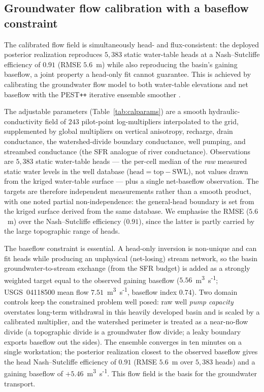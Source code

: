 \subsection{Groundwater flow calibration with a baseflow constraint}
\label{sec:calibration}

The calibrated flow field is simultaneously head- and flux-consistent: the deployed posterior
realization reproduces $5{,}383$ static water-table heads at a Nash--Sutcliffe efficiency of $0.91$
(RMSE $5.6$~m) while also reproducing the basin's gaining baseflow, a joint property a head-only fit
cannot guarantee. This is achieved by calibrating the groundwater flow model to both water-table
elevations and net baseflow with the PEST\texttt{++} iterative ensemble smoother
\citep{white2020pestpp}.

The adjustable parameters (Table~\ref{tab:calparams}) are a smooth hydraulic-conductivity field of
$243$ pilot-point log-multipliers interpolated to the grid, supplemented by global multipliers on
vertical anisotropy, recharge, drain conductance, the watershed-divide boundary conductance, well
pumping, and streambed conductance (the SFR analogue of river conductance). Observations are
$5{,}383$ static water-table heads --- the per-cell median of the \emph{raw} measured static water
levels in the well database ($\text{head} = \text{top} - \text{SWL}$), not values drawn from the
kriged water-table surface --- plus a single net-baseflow observation. The targets are therefore
independent measurements rather than a smooth product, with one noted partial non-independence: the
general-head boundary is set from the kriged surface derived from the same database. We emphasise the
RMSE ($5.6$~m) over the Nash--Sutcliffe efficiency ($0.91$), since the latter is partly carried by
the large topographic range of heads.

The baseflow constraint is essential. A head-only inversion is non-unique and can fit heads while
producing an unphysical (net-losing) stream network, so the basin groundwater-to-stream exchange
(from the SFR budget) is added as a strongly weighted target equal to the observed gaining baseflow
($5.56$~m\textsuperscript{3}~s\textsuperscript{-1}; USGS~04118500 mean flow
$7.51$~m\textsuperscript{3}~s\textsuperscript{-1}, baseflow index $0.74$). Two domain controls keep
the constrained problem well posed: raw well \emph{pump capacity} overstates long-term withdrawal in
this heavily developed basin and is scaled by a calibrated multiplier, and the watershed perimeter is
treated as a near-no-flow divide (a topographic divide is a groundwater flow divide; a leaky boundary
exports baseflow out the sides). The ensemble converges in ten minutes on a single workstation; the
posterior realization closest to the observed baseflow gives the head Nash--Sutcliffe efficiency of
$0.91$ (RMSE $5.6$~m over $5{,}383$ heads) and a gaining baseflow of
$+5.46$~m\textsuperscript{3}~s\textsuperscript{-1}. This flow field is the basis for the groundwater
transport.
